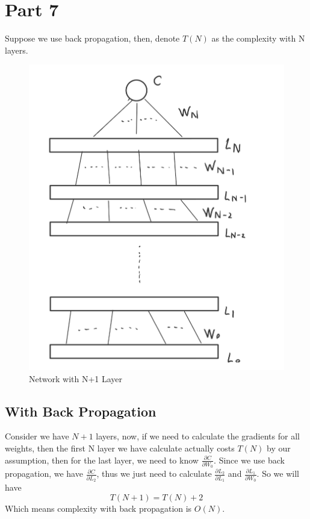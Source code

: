 \documentclass[12pt]{article}
\begin{document}
\section*{Part 7}
Suppose we use back propagation, then, denote $T(N)$ as the complexity with N layers.
\begin{figure}[h]
    \centering
    \includegraphics[scale=0.2]{report/part7_layer.jpg}
    \caption{Network with N+1 Layer}
\end{figure}
\subsection*{With Back Propagation}
Consider we have $N+1$ layers, now, if we need to calculate the gradients for all weights, then the first N layer we have calculate actually costs $T(N)$ by our assumption, then for the last layer, we need to know $\frac{\partial C}{\partial W_0}$. Since we use back propagation, we have $\frac{\partial C}{\partial L_2}$, thus we just need to calculate $\frac{\partial L_2}{\partial L_1}$ and $\frac{\partial L_1}{\partial W_0}$. So we will have
\[
    T(N+1) = T(N) + 2
\]
Which means complexity with back propagation is $O(N)$.
\end{document}
